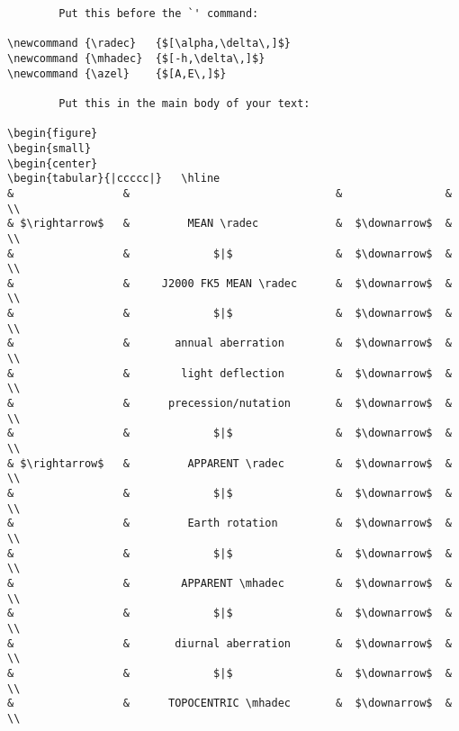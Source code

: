 {\footnotesize
\begin{verbatim}
        Put this before the `' command:

\newcommand {\radec}   {$[\alpha,\delta\,]$}
\newcommand {\mhadec}  {$[-h,\delta\,]$}
\newcommand {\azel}    {$[A,E\,]$}

        Put this in the main body of your text:

\begin{figure}
\begin{small}
\begin{center}
\begin{tabular}{|ccccc|}   \hline
&                 &                                &                & \\
& $\rightarrow$   &         MEAN \radec            &  $\downarrow$  & \\
&                 &             $|$                &  $\downarrow$  & \\
&                 &     J2000 FK5 MEAN \radec      &  $\downarrow$  & \\
&                 &             $|$                &  $\downarrow$  & \\
&                 &       annual aberration        &  $\downarrow$  & \\
&                 &        light deflection        &  $\downarrow$  & \\
&                 &      precession/nutation       &  $\downarrow$  & \\
&                 &             $|$                &  $\downarrow$  & \\
& $\rightarrow$   &         APPARENT \radec        &  $\downarrow$  & \\
&                 &             $|$                &  $\downarrow$  & \\
&                 &         Earth rotation         &  $\downarrow$  & \\
&                 &             $|$                &  $\downarrow$  & \\
&                 &        APPARENT \mhadec        &  $\downarrow$  & \\
&                 &             $|$                &  $\downarrow$  & \\
&                 &       diurnal aberration       &  $\downarrow$  & \\
&                 &             $|$                &  $\downarrow$  & \\
&                 &      TOPOCENTRIC \mhadec       &  $\downarrow$  & \\

\end{verbatim}}
